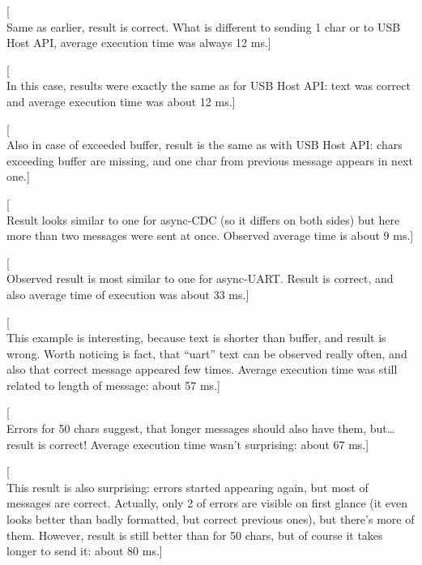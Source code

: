 [\\Same as earlier, result is correct.
What is different to sending 1 char or to USB Host API, average execution time
was always 12 ms.]

[\\In this case, results were exactly the same as for USB Host API: text was
correct and average execution time was about 12 ms.]

[\\Also in case of exceeded buffer, result is the same as with USB Host API:
chars exceeding buffer are missing, and one char from previous message appears
in next one.]

[\\Result looks similar to one for async-CDC (so it differs on both sides) but
here more than two messages were sent at once. 
Observed average time is about 9 ms.]

[\\Observed result is most similar to one for async-UART.
Result is correct, and also average time of execution was about 33 ms.]

[\\This example is interesting, because text is shorter than buffer, and
result is wrong. Worth noticing is fact, that ``uart'' text can be observed
really often, and also that correct message appeared few times.
Average execution time was still related to length of message: about 57 ms.]

[\\Errors for 50 chars suggest, that longer messages should also have them,
but\ldots\;result is correct!
Average execution time wasn't surprising: about 67 ms.]

[\\This result is also surprising: errors started appearing again, but most of
messages are correct.
Actually, only 2 of errors are visible on first glance (it even looks better
than badly formatted, but correct previous ones), but there's more of them.
However, result is still better than for 50 chars, but of course it takes
longer to send it: about 80 ms.]

